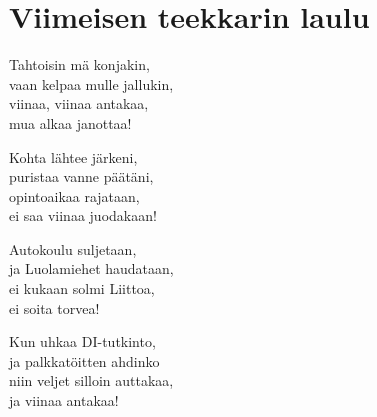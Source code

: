 \section{Viimeisen teekkarin laulu}

Tahtoisin mä konjakin,\\
vaan kelpaa mulle jallukin,\\
viinaa, viinaa antakaa,\\
mua alkaa janottaa!

Kohta lähtee järkeni,\\
puristaa vanne päätäni,\\
opintoaikaa rajataan,\\
ei saa viinaa juodakaan!

Autokoulu suljetaan,\\
ja Luolamiehet haudataan,\\
ei kukaan solmi Liittoa,\\
ei soita torvea!

Kun uhkaa DI-tutkinto,\\
ja palkkatöitten ahdinko\\
niin veljet silloin auttakaa,\\
ja viinaa antakaa!